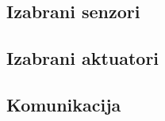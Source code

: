 \documentclass[times, utf8, diplomski, numeric]{templates/template}
\begin{document}
{{        \subsection{Izabrani senzori}{
        }

        \subsection{Izabrani aktuatori}{
        }

        \subsection{Komunikacija}{
        }
    }
}
\end{document}

